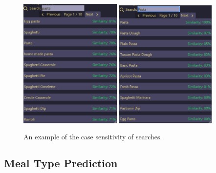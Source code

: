 \begin{figure}[p]
    \centering
    \caption{\label{fig:search_case_sensitive}An example of the case sensitivity of searches.}
    \includegraphics[width=0.45\textwidth]{figures/search_lower.png}
    \includegraphics[width=0.45\textwidth]{figures/search_upper.png}
\end{figure}

\subsection{Meal Type Prediction}

